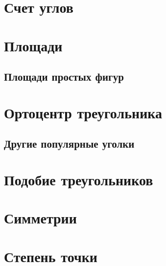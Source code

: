 \documentclass[twoside]{article}
\begin{document}
\pagestyle{empty}

% 


\newpage

\tableofcontents
\newpage

\setcounter{page}{1}
\pagestyle{fancy}


\section{Счет углов}


% 

\section{Площади}
\subsection{Площади простых фигур}

\section{Ортоцентр треугольника}


\subsection{Другие популярные уголки}



\section{Подобие треугольников}


\section{Симметрии}

\section{Степень точки}

\end{document}
